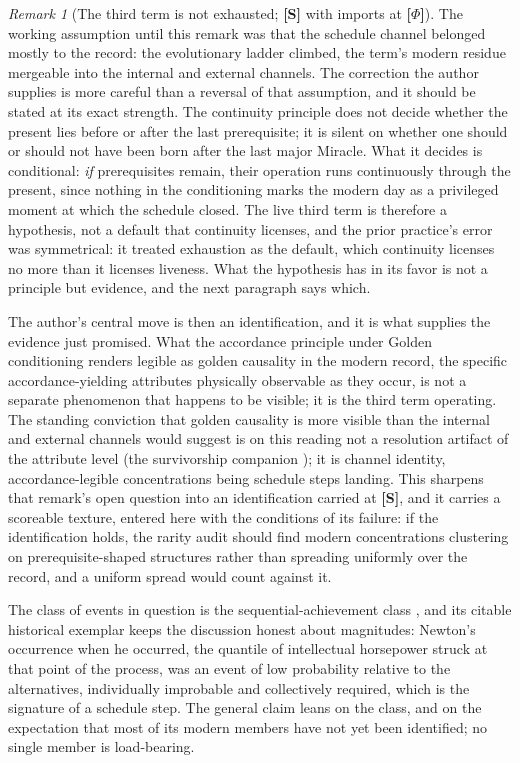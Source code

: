 \documentclass[11pt]{article}
\theoremstyle{plain}
\theoremstyle{definition}
\theoremstyle{remark}
\newtheorem{remark}[theorem]{Remark}
\begin{document}
\begin{remark}[The third term is not exhausted; \textbf{[S]} with imports at \textbf{[$\Phi$]}]
\label{sch:rem:notexhausted}
The working assumption until this remark was that the schedule
channel belonged mostly to the record: the evolutionary ladder
climbed, the term's modern residue mergeable into the internal and
external channels. The correction the author supplies is more
careful than a reversal of that assumption, and it should be stated
at its exact strength. The continuity principle does not decide
whether the present lies before or after the last prerequisite; it
is silent on whether one should or should not have been born after
the last major Miracle. What it decides is conditional: \emph{if}
prerequisites remain, their operation runs continuously through the
present, since nothing in the conditioning marks the modern day as
a privileged moment at which the schedule closed. The live third
term is therefore a hypothesis, not a default that continuity
licenses, and the prior practice's error was symmetrical: it treated
exhaustion as the default, which continuity licenses no more than
it licenses liveness. What the hypothesis has in its favor is not a
principle but evidence, and the next paragraph says which.

The author's central move is then an identification, and it is
what supplies the evidence just promised. What the
accordance principle under Golden conditioning renders legible as
golden causality in the modern record, the specific
accordance-yielding attributes physically observable as they occur,
is not a separate phenomenon that happens to be visible; it is the
third term operating. The standing conviction that golden causality
is more visible than the internal and external channels would
suggest is on this reading not a resolution artifact of the
attribute level (the survivorship companion \cite{SurvA}); it is
channel identity, accordance-legible concentrations being schedule
steps landing. This sharpens that remark's open question into an
identification carried at \textbf{[S]}, and it carries a scoreable
texture, entered here with the conditions of its failure: if the
identification holds, the rarity audit should find modern
concentrations clustering on prerequisite-shaped structures rather
than spreading uniformly over the record, and a uniform spread would
count against it.

The class of events in question is the sequential-achievement class
\cite{Ben25Seq}, and its citable historical exemplar keeps the
discussion honest about magnitudes: Newton's occurrence when he
occurred, the quantile of intellectual horsepower struck at that
point of the process, was an event of low probability relative to
the alternatives, individually improbable and collectively required,
which is the signature of a schedule step. The general claim leans
on the class, and on the expectation that most of its modern members
have not yet been identified; no single member is load-bearing.


\end{remark}
\end{document}
